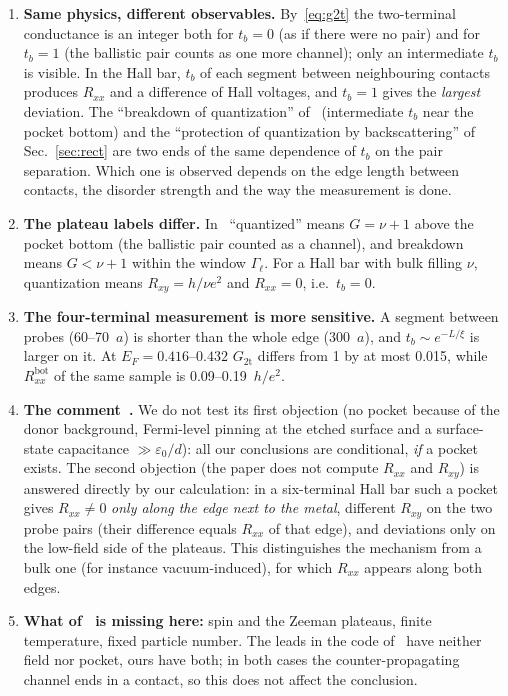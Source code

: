 \documentclass[11pt,a4paper]{article}
\newcommand{\tb}{t_b}
\newcommand{\he}{h/e^2}
\newcommand{\Rxy}{R_{xy}}
\newcommand{\Rxx}{R_{xx}}
\newcommand{\EF}{E_F}
\newcommand{\botm}{\text{bot}}
\begin{document}
\begin{enumerate}
\item \textbf{Same physics, different observables.} By~\eqref{eq:g2t} the
  two-terminal conductance is an integer both for $\tb=0$ (as if there were
  no pair) and for $\tb=1$ (the ballistic pair counts as one more channel);
  only an intermediate $\tb$ is visible. In the Hall bar, $\tb$ of each
  segment between neighbouring contacts produces $\Rxx$ and a difference of
  Hall voltages, and $\tb=1$ gives the \emph{largest} deviation. The
  ``breakdown of quantization'' of~\cite{andolina} (intermediate $\tb$ near
  the pocket bottom) and the ``protection of quantization by
  backscattering'' of Sec.~\ref{sec:rect} are two ends of the same
  dependence of $\tb$ on the pair separation. Which one is observed depends
  on the edge length between contacts, the disorder strength and the way
  the measurement is done.
\item \textbf{The plateau labels differ.} In~\cite{andolina}
  ``quantized'' means $G=\nu+1$ above the pocket bottom (the ballistic pair
  counted as a channel), and breakdown means $G<\nu+1$ within the window
  $\Gamma_\ell$. For a Hall bar with bulk filling $\nu$, quantization means
  $\Rxy=h/\nu e^2$ and $\Rxx=0$, i.e.\ $\tb=0$.
\item \textbf{The four-terminal measurement is more sensitive.} A segment
  between probes (60--70~$a$) is shorter than the whole edge (300~$a$), and
  $\tb\sim e^{-L/\xi}$ is larger on it. At $\EF=0.416$--$0.432$
  $G_\text{2t}$ differs from 1 by at most 0.015, while $\Rxx^\botm$ of the
  same sample is 0.09--0.19~$\he$.
\item \textbf{The comment~\cite{ciuti}.} We do not test its first objection
  (no pocket because of the donor background, Fermi-level pinning at the
  etched surface and a surface-state capacitance $\gg\varepsilon_0/d$): all
  our conclusions are conditional, \emph{if} a pocket exists. The second
  objection (the paper does not compute $\Rxx$ and $\Rxy$) is answered
  directly by our calculation: in a six-terminal Hall bar such a pocket gives
  $\Rxx\neq0$ \emph{only along the edge next to the metal}, different $\Rxy$
  on the two probe pairs (their difference equals $\Rxx$ of that edge), and
  deviations only on the low-field side of the plateaus. This distinguishes
  the mechanism from a bulk one (for instance vacuum-induced), for which
  $\Rxx$ appears along both edges.
\item \textbf{What of~\cite{andolina} is missing here:} spin and the Zeeman
  plateaus, finite temperature, fixed particle number. The leads in the code
  of~\cite{andolina} have neither field nor pocket, ours have both; in both
  cases the counter-propagating channel ends in a contact, so this does not
  affect the conclusion.
\end{enumerate}
\end{document}
